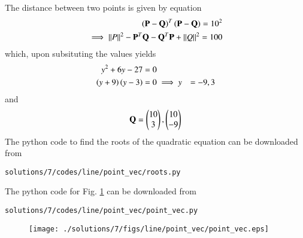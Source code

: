   The distance between two points is given by equation
 \begin{align}
 \left(\mathbf{P}-\mathbf{Q}\right)^T\left(\mathbf{P}-\mathbf{Q}\right)=10^2\\
\implies  \left\lVert P\right\rVert^2 - \mathbf{P}^T\mathbf{Q} - \mathbf{Q}^T\mathbf{P} + \left\lVert Q\right\rVert^2 = 100
 \end{align}
which, upon subsituting the values yields
 \begin{align}
 y^2 + 6y -27 &= 0\\
 \left(y+9\right)\left(y-3\right) &= 0
\implies y &= -9, 3
 \end{align}
and
\begin{align}
\mathbf{Q} = \begin{pmatrix}10 \\3\end{pmatrix}, \begin{pmatrix}10 \\-9\end{pmatrix}
\end{align}
 The python code to find the roots of the quadratic equation can be downloaded from
\begin{lstlisting}
solutions/7/codes/line/point_vec/roots.py
\end{lstlisting}
 The python code for Fig. \ref{fig:3.5.7}
can be downloaded from
\begin{lstlisting}
solutions/7/codes/line/point_vec/point_vec.py
\end{lstlisting}

\begin{figure}[!ht]
\centering
\texttt{[image: ./solutions/7/figs/line/point\_vec/point\_vec.eps]}
\caption{}
\label{fig:3.5.7}
\end{figure}
 
